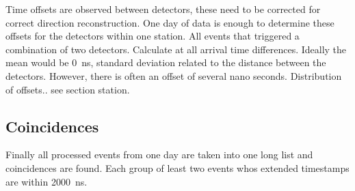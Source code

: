 Time offsets are observed between detectors, these need to be corrected for correct direction reconstruction. One day of data is enough to determine these offsets for the detectors within one station. All events that triggered a combination of two detectors. Calculate at all arrival time differences. Ideally the mean would be \SI{0}{\nano\second}, standard deviation related to the distance between the detectors. However, there is often an offset of several nano seconds. Distribution of offsets.. see section station. 


\subsection{Coincidences}

Finally all processed events from one day are taken into one long list and coincidences are found. Each group of least two events whos extended timestamps are within \SI{2000}{\nano\second}. 